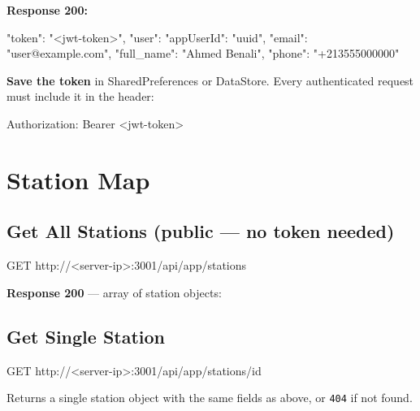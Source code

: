 \documentclass[12pt,a4paper]{report}
\begin{document}
\textbf{Response 200:}
\begin{codebox}
{
  "token": "<jwt-token>",
  "user": {
    "appUserId": "uuid",
    "email":     "user@example.com",
    "full_name": "Ahmed Benali",
    "phone":     "+213555000000"
  }
}
\end{codebox}

\textbf{Save the token} in SharedPreferences or DataStore. Every authenticated
request must include it in the header:

\begin{codebox}
Authorization: Bearer <jwt-token>
\end{codebox}

\section{Station Map}

\subsection{Get All Stations (public — no token needed)}

\begin{codebox}
GET http://<server-ip>:3001/api/app/stations
\end{codebox}

\textbf{Response 200} — array of station objects:
\begin{codebox}
\end{codebox}

\subsection{Get Single Station}

\begin{codebox}
GET http://<server-ip>:3001/api/app/stations/{id}
\end{codebox}

Returns a single station object with the same fields as above, or \texttt{404} if not found.
\end{document}
